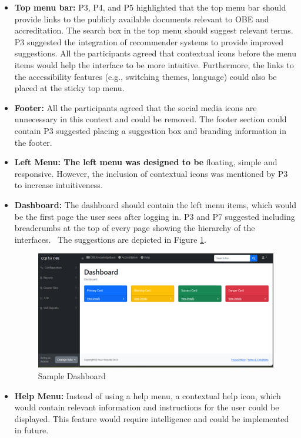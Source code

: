 \documentclass[journal,onecolumn]{IEEEtran}
\begin{document}
\begin{itemize}
    
    \item \textbf{Top menu bar: }P3, P4, and P5 highlighted that the top menu bar should provide links to the publicly available documents relevant to OBE and accreditation. The search box in the top menu should suggest relevant terms. P3 suggested the integration of recommender systems to provide improved suggestions. All the participants agreed that contextual icons before the menu items would help the interface to be more intuitive. Furthermore, the links to the accessibility features (e.g., switching themes, language) could also be placed at the sticky top menu.
    

\item \textbf{Footer: }All the participants agreed that the social media icons are unnecessary in this context and could be removed. The footer section could contain P3 suggested placing a suggestion box and branding information in the footer. 

\item \textbf{Left Menu: The left menu was designed to be }floating, simple and responsive. However, the inclusion of contextual icons was mentioned by P3 to increase intuitiveness. 

\item \textbf{Dashboard:} The dashboard should contain the left menu items, which would be the first page the user sees after logging in. P3 and P7 suggested including breadcrumbs at the top of every page showing the hierarchy of the interfaces.  The suggestions are depicted in Figure \ref{fig:dashboard}.

\begin{figure}
    \centering
    \includegraphics[width=0.8\linewidth]{img/Picture5.png}
    \caption{Sample Dashboard }
    \label{fig:dashboard}
\end{figure}

\item \textbf{Help Menu: }Instead of using a help menu, a contextual help icon, which would contain relevant information and instructions for the user could be displayed. This feature would require intelligence and could be implemented in future. 


\end{itemize}
\end{document}

